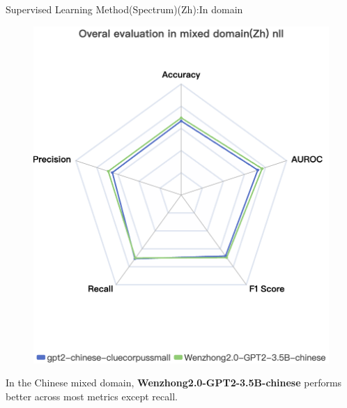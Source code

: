 \documentclass[serif]{beamer}
\begin{document}
\begin{frame}{Supervised Learning Method(Spectrum)(Zh):In domain}
    \begin{figure}
        \centering
        \includegraphics[width=0.5\linewidth]{images/Overal evaluation in mixed domain(Zh) nll.png}
        \label{fig:enter-label}
    \end{figure}
    \vspace{-0.2em}
\begin{flushleft}
\scriptsize
In the Chinese mixed domain, \textbf{Wenzhong2.0-GPT2-3.5B-chinese} performs better across most metrics except recall.
\normalize
\end{flushleft}
\end{frame}
\end{document}
